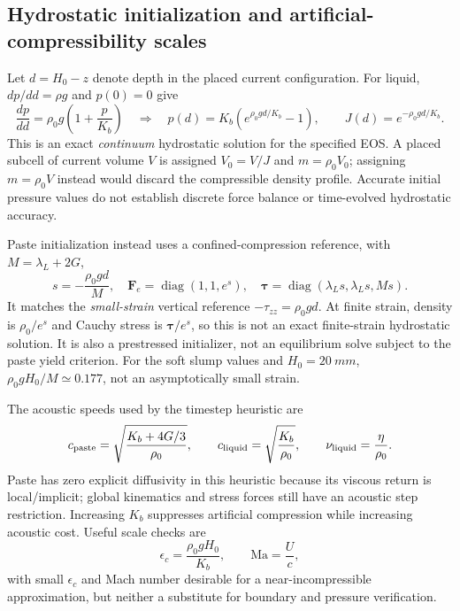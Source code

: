 \subsection{Hydrostatic initialization and artificial-compressibility scales}
Let $d=H_0-z$ denote depth in the placed current configuration. For liquid,
$dp/dd=\rho g$ and $p(0)=0$ give
\begin{equation}
 \frac{dp}{dd}=\rho_0g\left(1+\frac p{K_b}\right)
 \quad\Longrightarrow\quad
 p(d)=K_b\left(e^{\rho_0gd/K_b}-1\right),\qquad
 J(d)=e^{-\rho_0gd/K_b}. \label{eq:liquid-hydrostatic}
\end{equation}
This is an exact \emph{continuum} hydrostatic solution for the specified EOS.
A placed subcell of current volume $V$ is assigned $V_0=V/J$ and
$m=\rho_0V_0$; assigning $m=\rho_0V$ instead would discard the compressible
density profile. Accurate initial pressure values do not establish discrete
force balance or time-evolved hydrostatic accuracy.

Paste initialization instead uses a confined-compression reference, with
$M=\lambda_L+2G$,
\begin{equation}
 s=-\frac{\rho_0gd}{M},\quad
 \mathbf F_e=\operatorname{diag}(1,1,e^s),\quad
 \boldsymbol\tau=\operatorname{diag}(\lambda_Ls,\lambda_Ls,Ms).
 \label{eq:paste-hydrostatic}
\end{equation}
It matches the \emph{small-strain} vertical reference $-\tau_{zz}=\rho_0gd$.
At finite strain, density is $\rho_0/e^s$ and Cauchy stress is
$\boldsymbol\tau/e^s$, so this is not an exact finite-strain hydrostatic solution.
It is also a prestressed initializer, not an equilibrium solve subject to the
paste yield criterion. For the soft slump values and $H_0=\SI{20}{mm}$,
$\rho_0gH_0/M\simeq0.177$, not an asymptotically small strain.

The acoustic speeds used by the timestep heuristic are
\begin{equation}
 c_{\rm paste}=\sqrt{\frac{K_b+4G/3}{\rho_0}},\qquad
 c_{\rm liquid}=\sqrt{\frac{K_b}{\rho_0}},\qquad
 \nu_{\rm liquid}=\frac\eta{\rho_0}.
\end{equation}
Paste has zero explicit diffusivity in this heuristic because its viscous return
is local/implicit; global kinematics and stress forces still have an acoustic
step restriction. Increasing $K_b$ suppresses artificial compression while
increasing acoustic cost. Useful scale checks are
\begin{equation}
 \epsilon_c=\frac{\rho_0gH_0}{K_b},\qquad
 \mathrm{Ma}=\frac Uc,
\end{equation}
with small $\epsilon_c$ and Mach number desirable for a near-incompressible
approximation, but neither a substitute for boundary and pressure verification.

